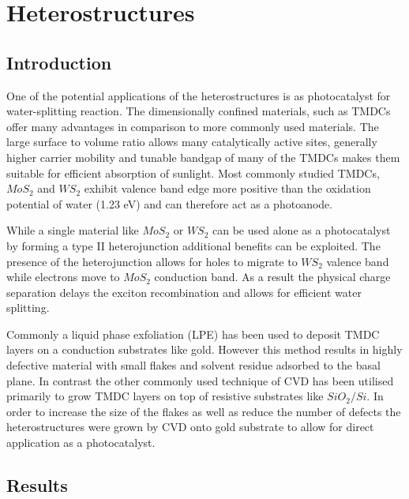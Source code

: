 \chapter{Heterostructures}
\label{cha:Heterostructures}

\section{Introduction}

One of the potential applications of the heterostructures is as photocatalyst for water-splitting reaction. The dimensionally confined materials, such as TMDCs offer many advantages in comparison to more commonly used materials. The large surface to volume ratio allows many catalytically active sites, generally higher carrier mobility and tunable bandgap of many of the TMDCs makes them suitable for efficient absorption of sunlight. Most commonly studied TMDCs, $MoS_2$ and $WS_2$ exhibit valence band edge more positive than the oxidation potential of water (1.23 eV) and can therefore act as a photoanode. 

While a single material like $MoS_2$ or $WS_2$ can be used alone as a photocatalyst by forming a type II heterojunction additional benefits can be exploited. The presence of the heterojunction allows for holes to migrate to $WS_2$ valence band while electrons move to $MoS_2$ conduction band. As a result the physical charge separation delays the exciton recombination and allows for efficient water splitting. 

Commonly a liquid phase exfoliation (LPE) has been used to deposit TMDC layers on a conduction substrates like gold. However this method results in highly defective material with small flakes and solvent residue adsorbed to the basal plane. In contrast the other commonly used technique of CVD has been utilised primarily to grow TMDC layers on top of resistive substrates like $SiO_2/Si$. In order to increase the size of the flakes as well as reduce the number of defects the heterostructures were grown by CVD onto gold substrate to allow for direct application as a photocatalyst.

\section{Results}


